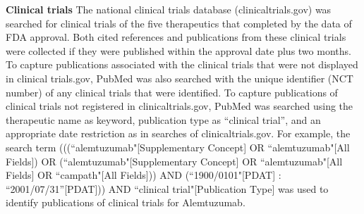 \documentclass[10pt,letterpaper]{article}
\newlength\savedwidth
\newcommand\thickhline{\noalign{\global\savedwidth\arrayrulewidth\global\arrayrulewidth 2pt}%
\hline
\noalign{\global\arrayrulewidth\savedwidth}}
\begin{document}
\begin{table}[!ht]
\begin{adjustwidth}{-0.5in}{0in} %
\centering
{}
\vspace{2 mm}
\caption{
{\bf Case Studies of Five Anti-Cancer Agents} Five anti-cancer therapeutics, with FDA approval dates ranging from 2001 to 2014, were selected as case studies. The unique identifier for each therapeutic is an FDA assigned NDA or BLA number. While multiple patents are typically associated with a drug or biological, the single US patent number displayed represents the primary invention that preceded approval of the therapeutic. The publication date for each patent is listed in the last column.}
\label{table1}
\end{adjustwidth}
\end{table}


\textbf{Clinical trials} The national clinical trials database (clinicaltrials.gov) was searched for clinical trials of the five therapeutics that completed by the data of FDA approval. Both cited references and publications from these clinical trials were collected if they were published within the approval date plus two months. To capture publications associated with the clinical trials that were not displayed in clinical trials.gov, PubMed was also searched with the unique identifier (NCT number) of any clinical trials that were identified. To capture publications of clinical trials not registered in clinicaltrials.gov, PubMed was searched using the therapeutic name as keyword, publication type as ``clinical trial'', and an appropriate date restriction as in searches of clinicaltrials.gov. For example, the search term (((``alemtuzumab"[Supplementary Concept] OR ``alemtuzumab"[All Fields]) OR (``alemtuzumab"[Supplementary Concept] OR ``alemtuzumab"[All Fields] OR ``campath"[All Fields])) AND (``1900/0101"[PDAT] : ``2001/07/31''[PDAT])) AND ``clinical trial"[Publication Type] was used to identify publications of clinical trials for Alemtuzumab.
\end{document}
